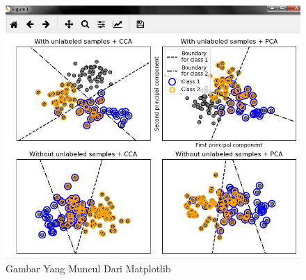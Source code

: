 \begin{enumerate}
\begin{figure}
\begin{center}
   	 \includegraphics[scale=1]{figures/hasil2.png}
   	 \caption{Gambar Yang Muncul Dari Matplotlib}	
	\end{center}
\end{figure}
\end{enumerate}

